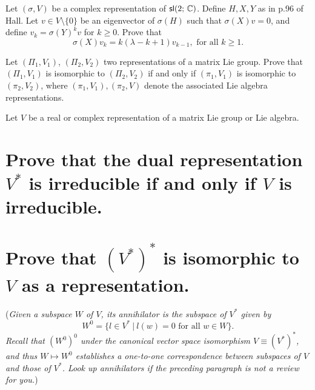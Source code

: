 \documentclass[
	pages,
	boxes,
	color=WildStrawberry
]{homework}
\begin{document}
\begin{problem}
Let $(\sigma, V)$ be a complex representation of $\mathsf{sl}(2;\, \mathbb{C})$. Define $H, X, Y$ as in p.96 of Hall. Let $v \in V \setminus \{0\}$ be an eigenvector of $\sigma(H)$ such that $\sigma(X) v = 0$, and define $v_{k} = \sigma(Y)^k v$ for $k \geq 0$. Prove that
\[
	\sigma(X)v_k = k(\lambda - k + 1)v_{k-1}, \text{ for all } k \geq 1.
\]
\end{problem}

\begin{problem}
Let $(\Pi_1, V_1)$, $(\Pi_2, V_2)$ two representations of a matrix Lie group. Prove that $(\Pi_1, V_1)$ is isomorphic to $(\Pi_2, V_2)$ if and only if $(\pi_1, V_1)$ is isomorphic to $(\pi_2, V_2)$, where $(\pi_1, V_1), (\pi_2, V)$ denote the associated Lie algebra representations.
\end{problem}

\begin{problem}
Let $V$ be a real or complex representation of a matrix Lie group or Lie algebra.
\begin{parts}
	\part{Prove that the dual representation $V^*$ is irreducible if and only if $V$ is irreducible.}
	\part{Prove that $(V^*)^*$ is isomorphic to $V$ as a representation.}
	(\textit{Given a subspace $W$ of $V$, its annihilator is the subspace of $V^*$ given by
		\[
			W^{0}= \{l \in V^*\ |\ l(w) = 0 \text{ for all }w \in W\}.
		\]
		Recall that $(W^{0})^{0}$ under the canonical vector space isomorphism $V \equiv (V^*)^*$, and thus $W \mapsto W^{0}$ establishes a one-to-one correspondence between subspaces of $V$ and those of $V^*$. Look up annihilators if the preceding paragraph is not a review for you.})
\end{parts}
\end{problem}
\end{document}
